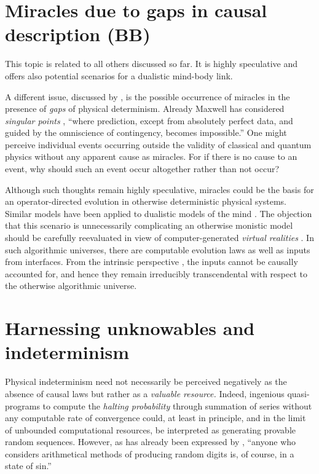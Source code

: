 \documentclass[%
 reprint,
 showpacs,
 showkeys,
 preprintnumbers,
 amsmath,amssymb,
 aps,
 prl,
  longbibliography,
 ]{revtex4-1}
\begin{document}
\section{Miracles due to gaps in causal description (BB)}

This topic is related to all others discussed so far. It is highly speculative and offers also
potential scenarios for a dualistic mind-body link.

A different issue, discussed by \citet{frank},
is the possible occurrence of miracles in the presence of {\em gaps} of physical determinism.
Already Maxwell has considered {\em singular points} \cite[212--213]{Campbell-1882}, {``where prediction,
except from absolutely perfect data, and guided by the omniscience of contingency, becomes impossible.''}
One might perceive individual events occurring
outside the validity of classical and quantum physics without any apparent cause as miracles.
For if there is no cause to an event,
why should such an event occur altogether rather than not occur?

Although such thoughts remain highly speculative, miracles
could be the basis for an operator-directed evolution in otherwise deterministic physical systems.
Similar models have  been applied to dualistic models of the mind \citep{popper-eccles,Eccles22051986,eccles:papal}.
The objection that this scenario is unnecessarily complicating an otherwise monistic model
should be carefully reevaluated in view of computer-generated {\em virtual realities} \citep{descartes-meditation,putnam:81,svozil-nat-acad}.
In such algorithmic universes, there are computable evolution laws as well as inputs from interfaces.
From the intrinsic perspective \citep{svozil-94}, the inputs cannot be causally accounted for,
and hence they remain irreducibly transcendental with respect to the otherwise algorithmic universe.

\section{Harnessing unknowables and indeterminism}

Physical indeterminism need not necessarily be perceived negatively as the absence of causal laws
but rather as a {\em valuable resource.}
Indeed, ingenious quasi-programs to compute the {\em halting probability} \citep{chaitin3,calude-dinneen06,rtx100200236p}
through summation of series without any computable rate of convergence could,
at least in principle, and in the limit of unbounded computational resources,
be interpreted as generating  provable random sequences.
However, as has already been expressed by  \citet[768]{von-neumann1},
{``anyone who considers arithmetical methods of producing random digits is, of course, in a state of sin.''}
\end{document}
